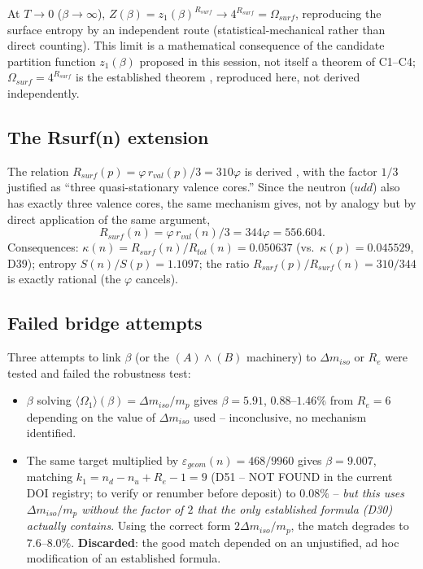 \documentclass[11pt]{article}
\def\texorpdfstring#1#2{#2}%
\begin{document}
\begin{resultbox}
At $T\to0$ ($\beta\to\infty$), $Z(\beta)=z_1(\beta)^{R_{surf}}\to4^{R_{surf}}=\Omega_{surf}$, reproducing the surface entropy \citep{D38} by an independent route (statistical-mechanical rather than direct counting). This limit is a mathematical consequence of the candidate partition function $z_1(\beta)$ proposed in this session, not itself a theorem of C1--C4; $\Omega_{surf}=4^{R_{surf}}$ is the established theorem \citep{D38}, reproduced here, not derived independently.
\end{resultbox}

\subsection{The \texorpdfstring{$R_{surf}(n)$}{Rsurf(n)} extension}
The relation $R_{surf}(p)=\varphi\,r_{val}(p)/3=310\varphi$ is derived \citep{D05}, with the factor $1/3$ justified as ``three quasi-stationary valence cores.'' Since the neutron ($udd$) also has exactly three valence cores, the same mechanism gives, not by analogy but by direct application of the same argument,
\begin{equation}
R_{surf}(n) = \varphi\,r_{val}(n)/3 = 344\varphi = 556.604.
\end{equation}
Consequences: $\kappa(n)=R_{surf}(n)/R_{tot}(n)=0.050637$ (vs.\ $\kappa(p)=0.045529$, D39); entropy $S(n)/S(p)=1.1097$; the ratio $R_{surf}(p)/R_{surf}(n)=310/344$ is exactly rational (the $\varphi$ cancels).

\subsection{Failed bridge attempts}
\begin{negativebox}
Three attempts to link $\beta$ (or the $(A)\wedge(B)$ machinery) to $\Delta m_{iso}$ or $R_e$ were tested and failed the robustness test:
\begin{itemize}
\item $\beta$ solving $\langle\Omega_1\rangle(\beta)=\Delta m_{iso}/m_p$ gives $\beta=5.91$, $0.88$--$1.46\%$ from $R_e=6$ depending on the value of $\Delta m_{iso}$ used -- inconclusive, no mechanism identified.
\item The same target multiplied by $\varepsilon_{geom}(n)=468/9960$ gives $\beta=9.007$, matching $k_1=n_d-n_u+R_e-1=9$ (D51 -- NOT FOUND in the current DOI registry; to verify or renumber before deposit) to $0.08\%$ -- \emph{but this uses $\Delta m_{iso}/m_p$ without the factor of $2$ that the only established formula (D30) actually contains}. Using the correct form $2\Delta m_{iso}/m_p$, the match degrades to $7.6$--$8.0\%$. \textbf{Discarded}: the good match depended on an unjustified, ad hoc modification of an established formula.
\end{itemize}
\end{negativebox}
\end{document}
